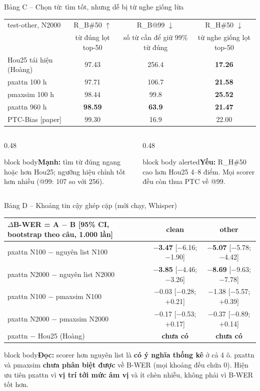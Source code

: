 \documentclass[aspectratio=169,xcolor=table]{beamer}
\newcommand{\bad}[1]{\textcolor{RiskRed}{\textbf{#1}}}
\newcommand{\good}[1]{\textcolor{GoodGreen}{\textbf{#1}}}
\newcommand{\src}[1]{{\tiny\color{TextGray}[#1]}}
\newcommand{\nbox}[2][block body]{\begin{beamercolorbox}[sep=0.45em,rounded=true]{#1}\footnotesize #2\end{beamercolorbox}}
\begin{document}
\begin{frame}{Bảng C -- Chọn từ: tìm tốt, nhưng dễ bị từ nghe giống lừa}
\centering\footnotesize\setlength{\tabcolsep}{6pt}
\begin{tabular}{lccc}
\toprule
test-other, N2000 & R\_B\#50 $\uparrow$ & R\_B@99 $\downarrow$ & R\_H\#50 $\downarrow$\\
 & {\scriptsize từ đúng lọt top-50} & {\scriptsize số từ cần để giữ 99\% từ đúng} & {\scriptsize từ nghe giống lọt top-50}\\
\midrule
Hou25 tái hiện (Hoàng) & 97.43 & 256.4 & \good{17.26}\\
pxattn 100 h & 97.71 & 106.7 & \bad{21.58}\\
pmaxsim 100 h & 98.44 & 99.8 & \bad{25.52}\\
pxattn 960 h & \good{98.59} & \good{63.9} & \bad{21.47}\\
PTC-Bias \src{paper} & 99.30 & 16.9 & 22.00\\
\bottomrule
\end{tabular}\par
\vspace{0.3cm}\raggedright
\begin{columns}[T]
\begin{column}{0.48\textwidth}
\nbox{\textbf{Mạnh:} tìm từ đúng ngang hoặc hơn Hou25; ngưỡng hiệu chỉnh tốt hơn nhiều (@99: 107 so với 256).}
\end{column}
\begin{column}{0.48\textwidth}
\nbox[block body alerted]{\textbf{Yếu:} R\_H\#50 cao hơn Hou25 4--8 điểm. Mọi scorer đều còn thua PTC về @99.}
\end{column}
\end{columns}
\end{frame}

\begin{frame}{Bảng D -- Khoảng tin cậy ghép cặp (mới chạy, Whisper)}
\centering\small\setlength{\tabcolsep}{6pt}
\begin{tabular}{lcc}
\toprule
$\Delta$B-WER = A $-$ B \src{95\% CI, bootstrap theo câu, 1.000 lần} & clean & other\\
\midrule
pxattn N100 $-$ nguyên list N100 & \good{$-$3.47} [$-$6.16; $-$1.90] & \good{$-$5.07} [$-$5.78; $-$4.42]\\
pxattn N2000 $-$ nguyên list N2000 & \good{$-$3.85} [$-$4.46; $-$3.26] & \good{$-$8.69} [$-$9.63; $-$7.78]\\
\midrule
pxattn N100 $-$ pmaxsim N100 & $-$0.03 [$-$0.28; +0.21] & $-$1.38 [$-$5.57; +0.39]\\
pxattn N2000 $-$ pmaxsim N2000 & $-$0.17 [$-$0.53; +0.17] & $-$0.37 [$-$0.89; +0.14]\\
\midrule
pxattn $-$ Hou25 (Hoàng) & \bad{chưa có} & \bad{chưa có}\\
\bottomrule
\end{tabular}\par
\vspace{0.3cm}\raggedright
\nbox{\textbf{Đọc:} scorer hơn nguyên list là \good{có ý nghĩa thống kê} ở cả 4 ô. pxattn và pmaxsim \textbf{chưa phân biệt được} về B-WER (mọi khoảng đều chứa 0). Hiện ưu tiên pxattn vì \textbf{vị trí tới mức âm vị} và ít chèn nhiễu, không phải vì B-WER tốt hơn.}
\end{frame}
\end{document}
